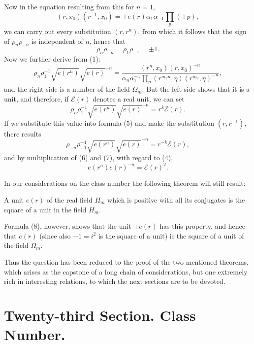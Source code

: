 \documentclass[11pt]{article}
\begin{document}
Now in the equation resulting from this for $n=1$,
\[
(r,x_0)(r^{-1},x_0)=\pm e(r)\alpha_1\alpha_{-1}\prod_p(\pm p),
\]
we can carry out every substitution $(r,r^n)$, from which it follows that the sign of $\rho_n\rho_{-n}$ is independent of $n$, hence that
\begin{equation}
\rho_n\rho_{-n}=\rho_1\rho_{-1}=\pm1.
\tag{4}
\end{equation}
Now we further derive from (1):
\begin{equation}
\rho_n\rho_1^{-1}\sqrt{e(r^n)}\sqrt{e(r)}^{-n}=\frac{(r^n,x_0)(r,x_0)^{-n}}{\alpha_n\alpha_1^{-1}\prod_p(r^{m_2n},\eta)(r^{m_2},\eta)^{-n}},
\tag{5}
\end{equation}
and the right side is a number of the field $\Omega_m$. But the left side shows that it is a unit, and therefore, if $\mathscr E(r)$ denotes a real unit, we can set
\begin{equation}
\rho_n\rho_1^{-1}\sqrt{e(r^n)}\sqrt{e(r)}^{-n}=r^k\mathscr E(r).
\tag{6}
\end{equation}
If we substitute this value into formula (5) and make the substitution $(r,r^{-1})$, there results
\begin{equation}
\rho_{-n}\rho_{-1}^{-1}\sqrt{e(r^n)}\sqrt{e(r)}^{-n}=r^{-k}\mathscr E(r),
\tag{7}
\end{equation}
and by multiplication of (6) and (7), with regard to (4),
\begin{equation}
e(r^n)e(r)^{-n}=\mathscr E(r)^2.
\tag{8}
\end{equation}

In our considerations on the class number the following theorem will still result:
\begin{center}
A unit $e(r)$ of the real field $H_m$ which is positive with all its conjugates is the square of a unit in the field $H_m$.
\end{center}
Formula (8), however, shows that the unit $\pm e(r)$ has this property, and hence that $e(r)$ (since also $-1=i^2$ is the square of a unit) is the square of a unit of the field $\Omega_m$.

Thus the question has been reduced to the proof of the two mentioned theorems, which arises as the capstone of a long chain of considerations, but one extremely rich in interesting relations, to which the next sections are to be devoted.

\section*{Twenty-third Section. Class Number.}
\end{document}
